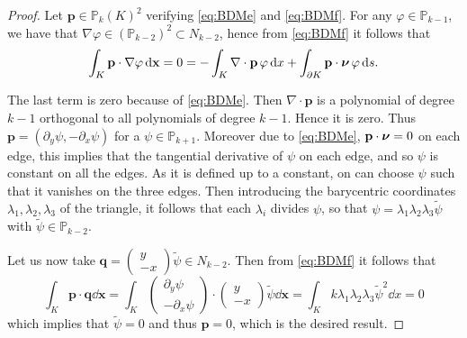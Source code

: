 \begin{proof}
Let $ \mathbf{p}\in \mathbb{P}_k(K)^2$ verifying \eqref{eq:BDMe} and \eqref{eq:BDMf}. 
For any $\varphi\in \mathbb{P}_{k-1}$, we have that $\nabla\varphi\in (\mathbb{P}_{k-2})^2\subset N_{k-2}$, hence from
\eqref{eq:BDMf} it follows that 
$$\int_K \mathbf{p}  \cdot \nabla\varphi \,{\rm d} \mathbf{x} =0 = -\int_K \nabla\cdot \mathbf{p}\, \varphi \,{\rm d} x
+\int_{\partial K} \mathbf{p}\cdot \boldsymbol{\nu} \, \varphi\,{\rm d} s. $$

The last term is zero because of \eqref{eq:BDMe}. Then $\nabla\cdot \mathbf{p}$ is a polynomial of degree $k-1$ orthogonal to all polynomials of degree $k-1$. Hence it is zero.
Thus $ \mathbf{p}= (\partial_y \psi, -\partial_x \psi)$ for a $\psi\in \mathbb{P}_{k+1}$. Moreover due
to  \eqref{eq:BDMe},  $ \mathbf{p}\cdot \boldsymbol{\nu}=0$ on each edge, this implies that the tangential derivative of $\psi$ on each edge, and so $\psi$ is constant on all the edges. As it is defined up to a constant, on can choose $\psi$ such that it vanishes on the three edges. Then introducing the barycentric coordinates $\lambda_1, \lambda_2, \lambda_3$ of the triangle, it follows that each $\lambda_i$ divides $\psi$, so that
$\psi=\lambda_1\lambda_2\lambda_3 \tilde{\psi}$ with $\tilde{\psi}\in \mathbb{P}_{k-2}$.

Let us now take $ \mathbf{q} =   \begin{pmatrix} y\\ -x \end{pmatrix} \tilde{\psi} \in N_{k-2}$. Then from 
\eqref{eq:BDMf} it follows that
$$\int_K \mathbf{p}  \cdot \mathbf{q}\dd \mathbf{x} = \int_K \begin{pmatrix} \partial_y \psi \\ -\partial_x \psi \end{pmatrix}\cdot \begin{pmatrix} y\\ -x \end{pmatrix} \tilde{\psi}\dd \mathbf{x}=
\int_K k\lambda_1\lambda_2\lambda_3 \tilde{\psi}^2 \dd x=0$$
which implies that $ \tilde{\psi}=0$ and thus $ \mathbf{p}=0$, which is the desired result.
\end{proof}

